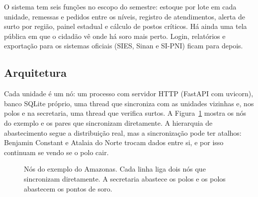 \documentclass[a4paper,12pt]{article}
\begin{document}
O sistema tem seis funções no escopo do semestre: estoque por lote em cada unidade,
remessas e pedidos entre os níveis, registro de atendimentos, alerta de surto por região,
painel estadual e cálculo de postos críticos. Há ainda uma tela pública em que o cidadão
vê onde há soro mais perto. Login, relatórios e exportação para os sistemas oficiais
(SIES, Sinan e SI-PNI) ficam para depois.

\subsection{Arquitetura}

Cada unidade é um nó: um processo com servidor HTTP (FastAPI com uvicorn), banco SQLite próprio, uma thread que
sincroniza com as unidades vizinhas e, nos polos e na secretaria, uma thread que verifica
surtos. A Figura~\ref{fig:topologia} mostra os nós do exemplo e os pares que sincronizam
diretamente. A hierarquia de abastecimento segue a distribuição real, mas a sincronização
pode ter atalhos: Benjamin Constant e Atalaia do Norte trocam dados entre si, e por isso
continuam se vendo se o polo cair.

\begin{figure}[htbp]
  \centering
  \caption{Nós do exemplo do Amazonas. Cada linha liga dois nós que sincronizam
  diretamente. A secretaria abastece os polos e os polos abastecem os pontos de soro.}
  \label{fig:topologia}
\end{figure}
\end{document}
